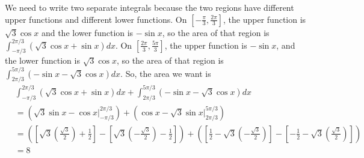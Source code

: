 \documentclass{article}
\begin{document}
\begin{enumerate}
\begin{solution}

    We need to write two separate integrals because the two regions have
    different upper functions and different lower functions.  On $\left[ -
      \frac{\pi}{3}, \frac{2 \pi}{3} \right]$, the upper function is
    $\sqrt{3} \cos x$ and the lower function is $-\sin x$, so the area of
    that region is $\displaystyle \int_{-\pi/3}^{2 \pi/3} \left( \sqrt{3}
      \cos x + \sin x \right) dx$.  On $\left[ \frac{2 \pi}{3}, \frac{5
        \pi}{3} \right]$, the upper function is $-\sin x$, and the lower
    function is $\sqrt{3} \cos x$, so the area of that region is
    $\displaystyle \int_{2 \pi/3}^{5 \pi/3} \left( -\sin x - \sqrt{3} \cos
      x\right) dx$.   So, the area we want is
    \begin{align*}
      & \int_{-\pi/3}^{2 \pi/3} \left( \sqrt{3} \cos x + \sin x \right) dx
      + \int_{2 \pi/3}^{5 \pi/3} \left( -\sin x - \sqrt{3} \cos x\right) dx
      \\
      &= \left( \sqrt{3} \sin x - \cos x \Big|_{-\pi/3}^{2\pi/3} \right) +
      \left( \cos x - \sqrt{3} \sin x \Big|_{2 \pi/3}^{5 \pi/3} \right)
      \\
      &= \left( \left[ \sqrt{3} \left( \frac{\sqrt{3}}{2} \right) +
          \frac{1}{2} \right] - \left[ \sqrt{3} \left( -
            \frac{\sqrt{3}}{2} \right) - \frac{1}{2} \right] \right) +
      \left( \left[ \frac{1}{2} - \sqrt{3} \left( - \frac{\sqrt{3}}{2}
          \right) \right] - \left[ -\frac{1}{2} - \sqrt{3} \left(
            \frac{\sqrt{3}}{2} \right) \right] \right) \\
      &= \boxed{8}
    \end{align*}
  \end{solution}


\end{enumerate}
\end{document}
